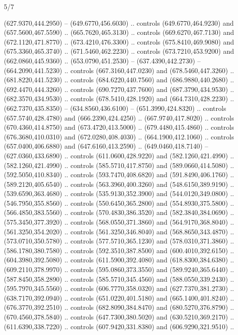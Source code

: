 \begin{flagdescription}{5/7}
\begin{scope}[xshift=0.5\flaglength]
\begin{scope}[scale=0.0019\flagwidth,yshift=190.5mm,xshift=-137.7mm]
\begin{scope}[y=0.80pt, x=0.80pt, yscale=-1, xscale=1, inner sep=0pt, outer sep=0pt]
  (627.9370,444.2950) -- (649.6770,456.6030) .. controls (649.6770,464.9230) and
  (657.5600,467.5590) .. (665.7620,465.3130) .. controls (669.6270,467.7130) and
  (672.1120,471.8770) .. (673.4210,476.3300) .. controls (675.8410,469.9080) and
  (675.3360,465.3740) .. (671.5460,462.2230) .. controls (673.7210,453.9200) and
  (662.0860,445.9360) .. (653.0790,451.2530) -- (637.4390,442.2730) --
  (664.2090,441.5230) .. controls (667.3160,447.0230) and (678.5460,447.3260) ..
  (681.8220,441.5230) .. controls (684.6220,440.7560) and (686.9880,440.2680) ..
  (692.4470,444.3260) .. controls (690.7270,437.7600) and (687.3790,434.9530) ..
  (682.3570,434.9530) .. controls (678.5410,428.1920) and (664.7310,428.2230) ..
  (662.7370,435.8350) -- (634.8560,436.6100) -- (651.3990,424.8320) .. controls
  (657.5740,428.4780) and (666.2390,424.4250) .. (667.9740,417.8020) .. controls
  (670.4360,414.8750) and (673.4720,413.5000) .. (679.4480,415.4860) .. controls
  (676.3680,410.0310) and (672.0280,408.4030) .. (664.1900,412.1060) .. controls
  (657.0400,406.6880) and (647.6160,413.2590) .. (649.0460,418.7140) --
  (627.0360,433.6890) .. controls (611.0600,428.9220) and (582.1260,421.4990) ..
  (582.1260,421.4990) .. controls (585.5710,417.8750) and (589.0660,414.5080) ..
  (592.5050,410.8340) .. controls (593.7470,408.6820) and (591.8490,406.1760) ..
  (589.2120,405.6540) .. controls (563.3960,400.3260) and (548.6150,389.9190) ..
  (539.6590,363.4680) .. controls (535.9130,352.3900) and (544.0120,349.0800) ..
  (546.7950,355.8560) .. controls (550.6450,365.2800) and (554.8930,375.5800) ..
  (566.4850,383.5560) .. controls (570.4830,386.3520) and (582.3840,384.0690) ..
  (575.3450,377.3920) .. controls (568.0550,371.3860) and (564.9170,368.8040) ..
  (561.3250,354.2020) .. controls (561.3250,346.8040) and (568.8650,343.4870) ..
  (573.0710,350.5780) .. controls (577.5710,365.1230) and (578.0310,371.3860) ..
  (586.1780,380.7580) .. controls (592.3510,387.8500) and (600.4010,392.6150) ..
  (604.3980,392.5080) .. controls (611.5900,392.4080) and (618.8300,384.6380) ..
  (609.2110,378.9970) .. controls (595.0860,373.3550) and (589.9240,365.6440) ..
  (587.8450,358.2890) .. controls (585.5710,345.4560) and (588.0550,339.2430) ..
  (595.7970,345.5560) .. controls (606.7770,358.0320) and (627.7370,381.2730) ..
  (638.7170,392.0940) .. controls (651.0220,401.5180) and (665.1400,401.8240) ..
  (676.3770,392.2510) .. controls (682.8090,384.8470) and (680.5270,376.8790) ..
  (670.4560,378.5840) .. controls (647.7300,380.5020) and (630.5210,369.2170) ..
  (611.6390,338.7220) .. controls (607.9420,331.8380) and (606.9290,321.9510) ..

\end{scope}
\end{scope}
\end{scope}
\end{flagdescription}
